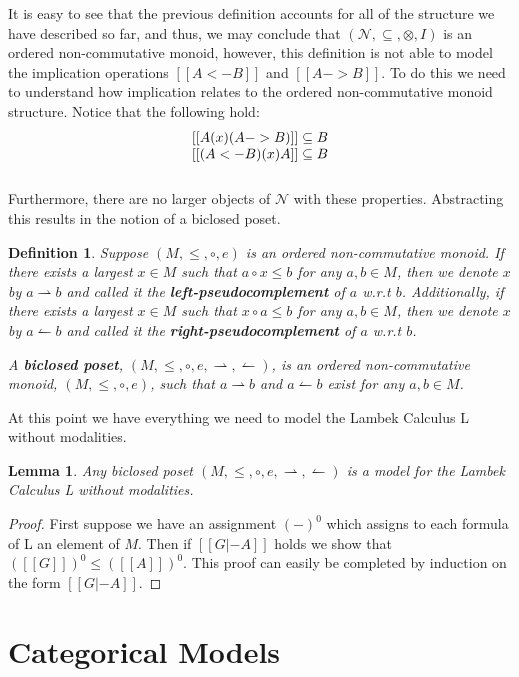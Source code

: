 \documentclass{article}
\newcommand{\N}{\mathcal{N}}
\newcommand{\rto}{\leftharpoonup}
\newcommand{\lto}{\rightharpoonup}
\newtheorem{lemma}[theorem]{Lemma}
\newtheorem{definition}[theorem]{Definition}
\begin{document}
It is easy to see that the previous definition accounts for all of the
structure we have described so far, and thus, we may conclude that
$(\N, \subseteq, \otimes, I)$ is an ordered non-commutative monoid,
however, this definition is not able to model the implication
operations $[[A <- B]]$ and $[[A -> B]]$.  To do this we need to
understand how implication relates to the ordered non-commutative
monoid structure.  Notice that the following hold:
\[
\begin{array}{lll}
  [[A (x) (A -> B)]] \subseteq B\\ \relax
  [[(A <- B) (x) A]] \subseteq B\\ \relax
\end{array}
\]
Furthermore, there are no larger objects of $\N$ with these
properties.  Abstracting this results in the notion of a biclosed
poset.
\begin{definition}
  \label{def:biclosed-poset}
  Suppose $(M, \leq, \circ, e)$ is an ordered non-commutative monoid.
  If there exists a largest $x \in M$ such that $a \circ x \leq b$ for
  any $a, b \in M$, then we denote $x$ by $a \lto b$ and called it
  the \textbf{left-pseudocomplement} of $a$ w.r.t $b$.  Additionally,
  if there exists a largest $x \in M$ such that $x \circ a \leq b$ for
  any $a, b \in M$, then we denote $x$ by $a \rto b$ and called it
  the \textbf{right-pseudocomplement} of $a$ w.r.t $b$.

  A \textbf{biclosed poset}, $(M, \leq, \circ, e, \lto, \rto)$, is an
  ordered non-commutative monoid, $(M, \leq, \circ, e)$, such that $a
  \lto b$ and $a \rto b$ exist for any $a,b \in M$.
\end{definition}

At this point we have everything we need to model the Lambek Calculus
L without modalities.
\begin{lemma}
  \label{lemma:biclosed-poset-model-L}
  Any biclosed poset $(M, \leq, \circ, e, \lto, \rto)$ is a model for
  the Lambek Calculus L without modalities.
\end{lemma}
\begin{proof}
  First suppose we have an assignment $(-)^0$ which assigns to each
  formula of L an element of $M$.  Then if $[[G |- A]]$ holds we
  show that $([[G]])^0 \leq ([[A]])^0$.  This proof can easily be
  completed by induction on the form $[[G |- A]]$.  
\end{proof}

\section{Categorical Models}
\end{document}
